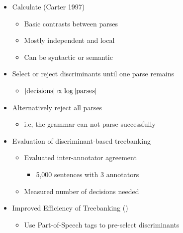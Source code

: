 \documentclass[a4paper,landscape,headrule,footrule,dvips]{foils}
\begin{document}
\begin{CJK}{UTF8}{min}
\begin{itemize}
\item Calculate  (Carter 1997)
  \begin{itemize}
  \item Basic contrasts between parses
  \item Mostly independent and local
  \item Can be syntactic or semantic
  \end{itemize}
\item Select or reject discriminants until one parse remains
  \begin{itemize}
  \item $|{\textnormal{decisions}| \propto \log |\textnormal{parses}|}$
  \end{itemize}
\item Alternatively reject all parses
  \begin{itemize}
  \item i.e, the grammar can not parse successfully
  \end{itemize}
\end{itemize}

\begin{itemize}
\item Evaluation of discriminant-based treebanking
  \begin{itemize}
  \item Evaluated inter-annotator agreement 
    \begin{itemize}
    \item 5,000 sentences with 3 annotators
    \end{itemize}
  \item Measured number of decisions needed
  \end{itemize}
\item Improved Efficiency of Treebanking ()
  \begin{itemize}
  \item Use Part-of-Speech tags to pre-select discriminants
  \end{itemize}
\end{itemize}




\end{CJK}
\end{document}
